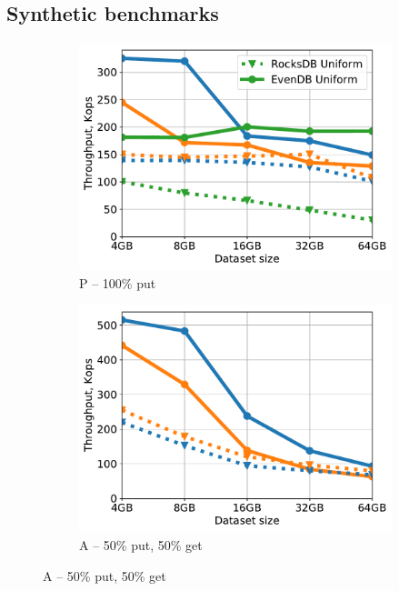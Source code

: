 \subsection{Synthetic benchmarks}
\label{ssec:synthetic} 

\begin{figure}[tb]
\centering
\begin{subfigure}{0.3\linewidth}
\includegraphics[width=\textwidth]{figs/Workload_P_line.pdf}
\caption{P -- 100\% put}
\label{fig:throughput:p}
\end{subfigure}
\hspace{0.01\linewidth} 
\begin{subfigure}{0.3\linewidth}
\includegraphics[width=\textwidth]{figs/Workload_A_line.pdf}
\caption{A -- 50\% put, 50\% get}

\end{subfigure}
\end{figure}
